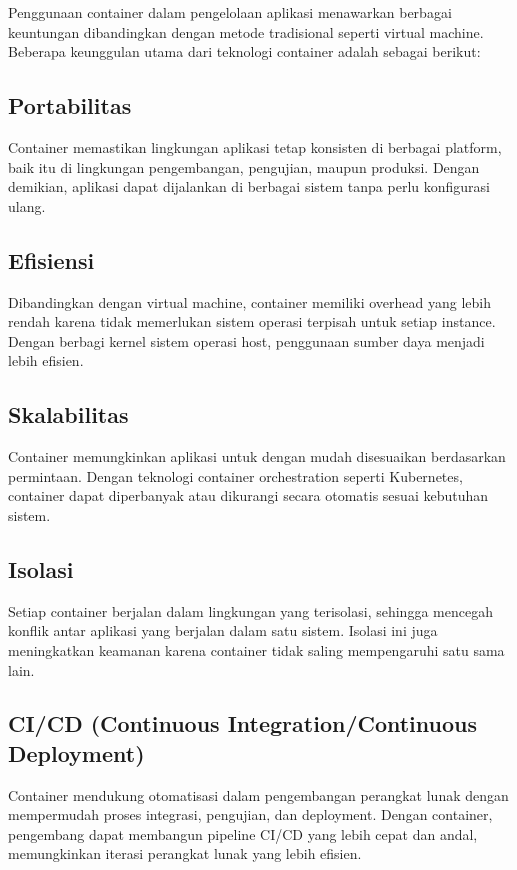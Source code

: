 Penggunaan container dalam pengelolaan aplikasi menawarkan berbagai keuntungan dibandingkan dengan metode tradisional seperti virtual machine. Beberapa keunggulan utama dari teknologi container adalah sebagai berikut:

\subsection{Portabilitas}
Container memastikan lingkungan aplikasi tetap konsisten di berbagai platform, baik itu di lingkungan pengembangan, pengujian, maupun produksi. Dengan demikian, aplikasi dapat dijalankan di berbagai sistem tanpa perlu konfigurasi ulang.

\subsection{Efisiensi}
Dibandingkan dengan virtual machine, container memiliki overhead yang lebih rendah karena tidak memerlukan sistem operasi terpisah untuk setiap instance. Dengan berbagi kernel sistem operasi host, penggunaan sumber daya menjadi lebih efisien.

\subsection{Skalabilitas}
Container memungkinkan aplikasi untuk dengan mudah disesuaikan berdasarkan permintaan. Dengan teknologi container orchestration seperti Kubernetes, container dapat diperbanyak atau dikurangi secara otomatis sesuai kebutuhan sistem.

\subsection{Isolasi}
Setiap container berjalan dalam lingkungan yang terisolasi, sehingga mencegah konflik antar aplikasi yang berjalan dalam satu sistem. Isolasi ini juga meningkatkan keamanan karena container tidak saling mempengaruhi satu sama lain.

\subsection{CI/CD (Continuous Integration/Continuous Deployment)}
Container mendukung otomatisasi dalam pengembangan perangkat lunak dengan mempermudah proses integrasi, pengujian, dan deployment. Dengan container, pengembang dapat membangun pipeline CI/CD yang lebih cepat dan andal, memungkinkan iterasi perangkat lunak yang lebih efisien.


